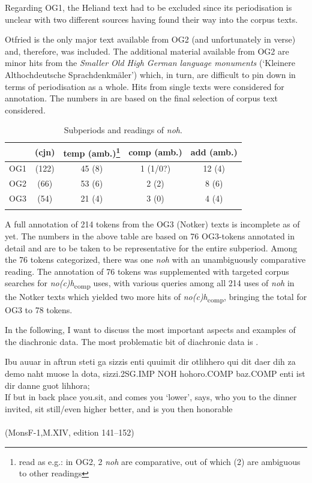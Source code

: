 \documentclass[output=paper]{langsci/langscibook}
\begin{document}
Regarding OG1, the Heliand text had to be excluded since its periodisation is unclear with two different sources having found their way into the corpus texts.

Otfried is the only major text available from OG2 (and unfortunately in verse) and, therefore, was included. The additional material available from OG2 are minor hits from the \textit{Smaller Old High German language monuments} (`Kleinere Althochdeutsche Sprachdenkmäler') which, in turn, are difficult to pin down in terms of periodisation as a whole. Hits from single texts were considered for annotation. The numbers in  are based on the final selection of corpus text considered.


\begin{table}[p]
\begin{tabular}{lcccc}
\lsptoprule
	& (cjn) & temp (amb.)\footnote{read as e.g.: in OG2, 2 \textit{noh} are comparative, out of which (2) are ambiguous to other readings}& comp (amb.)	& add (amb.)	\\
\midrule
OG1		& (122) & 45 (8)    & 1 (1/0?)  & 12 (4)    \\
OG2		& (66)  & 53 (6)    & 2 (2)     & 8 (6)     \\
OG3		& (54)  & 21 (4)    & 3 (0)     & 4 (4)     \\
\lspbottomrule
\end{tabular}
\caption{Subperiods and readings of \textit{noh}.}
\label{tab:subperiods_and_readings}
\end{table}

A full annotation of 214 tokens from the OG3 (Notker) texts is incomplete as of yet. The numbers in the above table are based on 76 OG3-tokens annotated in detail and are to be taken to be representative for the entire subperiod. Among the 76 tokens categorized, there was one \textit{noh} with an unambiguously comparative reading. The annotation of 76 tokens was supplemented with targeted corpus searches for \textit{no(c)h}\textsubscript{comp} uses, with various queries among all 214 uses of \textit{noh} in the Notker texts which yielded two more hits of \textit{no(c)h}\textsubscript{comp}, bringing the total for OG3 to 78 tokens.

In the following, I want to discuss the most important aspects and examples of the diachronic data. The most problematic bit of diachronic data is .

\ea\gll Ibu auuar in aftrun steti {ga sizzis} enti quuimit dir otlihhero {qui dit} daer dih za demo {naht muose} {la dota,} sizzi.2SG.IMP NOH hohoro.COMP baz.COMP enti ist dir danne {guot lihhora;}\\
       If but in back place you.sit, and comes you `lower', says, who you to the dinner invited, sit still/even higher better, and is you then honorable\\
 \label{OG1_comp?_00} \\ \hfill (MonsF-1,M.XIV, edition 141--152)
\z
\end{document}
